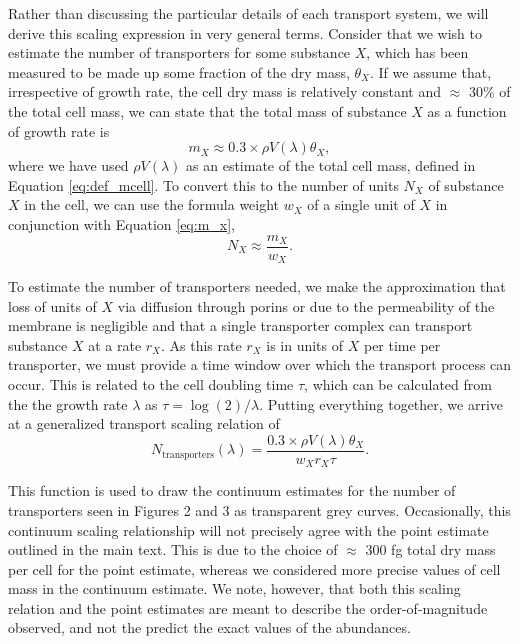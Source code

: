 Rather than discussing the particular details of each transport system, we will
derive this scaling expression in very general terms. Consider that we wish to
estimate the number of transporters for some substance $X$, which has been
measured to be made up some fraction of the dry mass, $\theta_X$. If we assume
that, irrespective of growth rate, the cell dry mass is relatively constant
\citep{basan2015} and $\approx$ 30\% of the total cell mass, we can state that
the total mass of substance $X$ as a function of growth rate is
\begin{equation}
m_X \approx 0.3 \times \rho V(\lambda) \theta_X,
\label{eq:m_x}
\end{equation}
where we have used $\rho V(\lambda)$ as an estimate of the total cell mass,
defined in Equation \ref{eq:def_mcell}. To convert this to the number of units $N_X$ of substance
$X$ in the cell, we can use the formula weight $w_X$ of a single unit of $X$ in
conjunction with Equation \ref{eq:m_x},
\begin{equation}
    N_X \approx \frac{m_X}{w_X}.
    \label{eq:n_x}
\end{equation}

To estimate the number of transporters needed, we make the approximation that
loss of units of $X$ via diffusion through porins or due to the permeability of
the membrane is negligible  and that a single transporter complex can transport
substance $X$ at a rate $r_X$. As this rate $r_X$  is in units of $X$ per time
per transporter, we must provide a time window over which the transport process
can occur. This is related to the cell doubling time $\tau$, which can be
calculated from the the growth rate $\lambda$ as $\tau = \log(2) / \lambda$.
Putting everything together, we arrive at a generalized transport scaling
relation of
\begin{equation}
N_\text{transporters}(\lambda) = \frac{0.3 \times \rho V(\lambda)\theta_X}{w_X r_X \tau}.
\label{eq:transporter_continuum}
\end{equation}

This function is used to draw the continuum estimates for the number of
transporters seen in Figures 2 and 3 as transparent grey curves. Occasionally,
this continuum scaling relationship will not precisely agree with the point
estimate outlined in the main text. This is due to the choice of $\approx$ 300 fg
total dry mass per cell for the point
estimate, whereas we considered more precise values of cell mass in the continuum estimate. We
note, however, that both this scaling relation and the point estimates are meant
to describe the order-of-magnitude observed, and not the predict the exact
values of the abundances.

